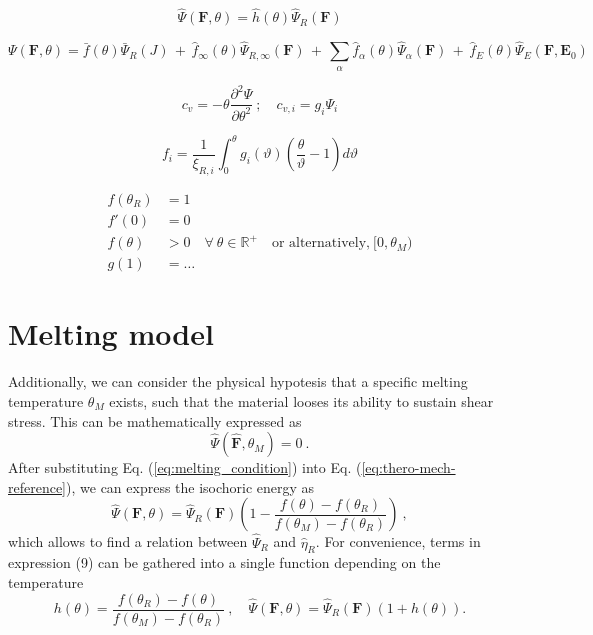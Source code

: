 \documentclass[a4paper,12pt]{article}
\newcommand{\E}{\mathbf{E}}
\newcommand{\F}{\mathbf{F}}
\newcommand{\0}{\mathbf{0}}
\begin{document}
\begin{equation*}
  \hat\Psi(\F,\theta) = \hat{h}(\theta)\hat\Psi_R(\F)
\end{equation*}


\begin{equation*}
  \Psi(\F,\theta) = 
    \bar{f}(\theta) \bar\Psi_R(J) \, + \,
    \hat{f}_{\infty}(\theta) \hat\Psi_{R,\infty}(\F) \, + \,
    \sum_{\alpha} \hat{f}_\alpha(\theta) \hat\Psi_\alpha(\F) \, + \,
    \hat{f}_E(\theta) \hat\Psi_E(\F,\E_0)
\end{equation*}

\begin{equation*}
  c_v = -\theta \frac{\partial^2\Psi}{\partial\theta^2} \ ; \quad c_{v,i} = g_i \Psi_i
\end{equation*}

\begin{equation*}
  f_i = \frac{1}{\xi_{R,i}}
    \int_0^\theta g_i(\vartheta) \left( \frac{\theta}{\vartheta} - 1 \right) d\vartheta
\end{equation*}

\begin{align*}
  f(\theta_R) &= 1 \\
  f'(0) &= 0 \\
  f(\theta) &> 0 \quad \forall \ \theta \in \mathbb{R}^+ \quad \text{or alternatively,} \ [0,\theta_M) \\
  g(1) &= \dots
\end{align*}



\section*{Melting model}

Additionally, we can consider the physical hypotesis that a specific melting temperature $\theta_M$ exists, such that the material looses its ability to sustain shear stress. This can be mathematically expressed as
\begin{equation} \label{eq:melting_condition}
  \hat{\Psi}(\hat{\F}, \theta_M) = 0\ .
\end{equation}
After substituting Eq. (\ref{eq:melting_condition}) into Eq. (\ref{eq:thero-mech-reference}), we can express the isochoric energy as
\begin{equation}
  \hat\Psi(\F,\theta) = \hat\Psi_R(\F) \left( 1 -
    \frac{f(\theta) - f(\theta_R)}{f(\theta_M) - f(\theta_R)}
  \right)\ ,
\end{equation}
which allows to find a relation between $\hat\Psi_R$ and $\hat\eta_R$. For convenience, terms in expression (9) can be gathered into a single function depending on the temperature
\begin{equation}
  h(\theta) = \frac{f(\theta_R) - f(\theta)}{f(\theta_M) - f(\theta_R)} \ ,\quad 
  \hat\Psi(\F,\theta) = \hat\Psi_R(\F) (1 + h(\theta)) .
\end{equation}
\end{document}
